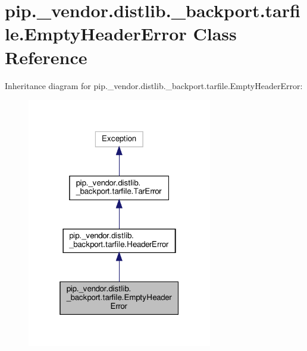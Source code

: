 \hypertarget{classpip_1_1__vendor_1_1distlib_1_1__backport_1_1tarfile_1_1EmptyHeaderError}{}\section{pip.\+\_\+vendor.\+distlib.\+\_\+backport.\+tarfile.\+Empty\+Header\+Error Class Reference}
\label{classpip_1_1__vendor_1_1distlib_1_1__backport_1_1tarfile_1_1EmptyHeaderError}


Inheritance diagram for pip.\+\_\+vendor.\+distlib.\+\_\+backport.\+tarfile.\+Empty\+Header\+Error\+:
\nopagebreak
\begin{figure}[H]
\begin{center}
\leavevmode
\includegraphics[width=229pt]{classpip_1_1__vendor_1_1distlib_1_1__backport_1_1tarfile_1_1EmptyHeaderError__inherit__graph}
\end{center}
\end{figure}


